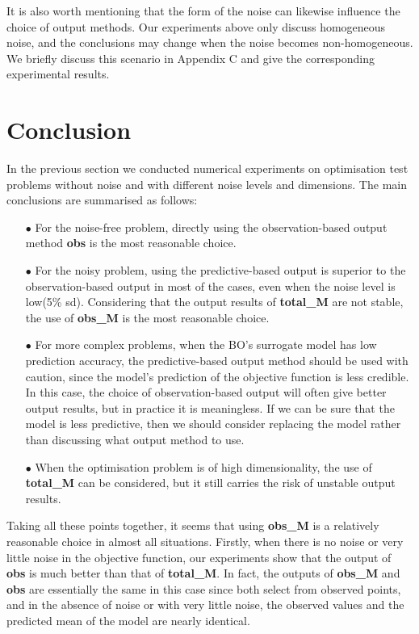 \documentclass{article}
\begin{document}
\hspace{2em}It is also worth mentioning that the form of the noise can likewise influence the choice of output methods. Our experiments above only discuss homogeneous noise, and the conclusions may change when the noise becomes non-homogeneous. We briefly discuss this scenario in Appendix C and give the corresponding experimental results.



\section{Conclusion}

\hspace{2em}In the previous section we conducted numerical experiments on optimisation test problems without noise and with different noise levels and dimensions. The main conclusions are summarised as follows: 


\begin{itemize}[itemsep=2pt,topsep=0pt,parsep=0pt]
    \item[$\bullet$] For the noise-free problem, directly using the observation-based output method \textbf{obs} is the most reasonable choice. 
    \item[$\bullet$] For the noisy problem, using the predictive-based output is superior to the observation-based output in most of the cases, even when the noise level is low(5\% sd). Considering that the output results of \textbf{total\_M} are not stable, the use of \textbf{obs\_M} is the most reasonable choice.
    \item[$\bullet$] For more complex problems, when the BO's surrogate model has low prediction accuracy, the predictive-based output method should be used with caution, since the model's prediction of the objective function is less credible. In this case, the choice of observation-based output will often give better output results, but in practice it is meaningless. If we can be sure that the model is less predictive, then we should consider replacing the model rather than discussing what output method to use.
    \item[$\bullet$] When the optimisation problem is of high dimensionality, the use of \textbf{total\_M} can be considered, but it still carries the risk of unstable output results.  
       
    \end{itemize} 

\hspace{2em}Taking all these points together, it seems that using \textbf{obs\_M} is a relatively reasonable choice in almost all situations. Firstly, when there is no noise or very little noise in the objective function, our experiments show that the output of \textbf{obs} is much better than that of \textbf{total\_M}. In fact, the outputs of \textbf{obs\_M} and \textbf{obs} are essentially the same in this case since both select from observed points, and in the absence of noise or with very little noise, the observed values and the predicted mean of the model are nearly identical. 
\end{document}
